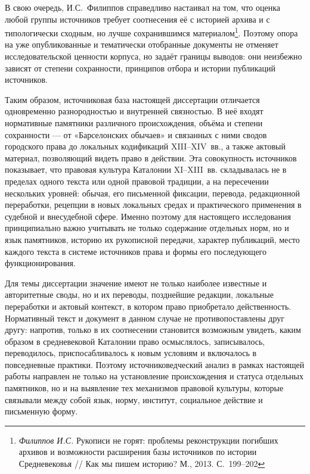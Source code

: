 В свою очередь, И.С.~Филиппов справедливо настаивал на том, что оценка любой группы источников требует соотнесения её с историей архива и с типологически сходным, но лучше сохранившимся материалом\footnote{\emph{Филиппов И.С.} Рукописи не горят: проблемы реконструкции погибших архивов и возможности расширения базы источников по истории Средневековья // Как мы пишем историю? М., 2013. С.~199--202}. Поэтому опора на уже опубликованные и тематически отобранные документы не отменяет исследовательской ценности корпуса, но задаёт границы выводов: они неизбежно зависят от степени сохранности, принципов отбора и истории публикаций источников.

Таким образом, источниковая база настоящей диссертации отличается одновременно разнородностью и внутренней связностью. В неё входят нормативные памятники различного происхождения, объёма и степени сохранности --- от «Барселонских обычаев» и связанных с ними сводов городского права до локальных кодификаций XIII--XIV~вв., а также актовый материал, позволяющий видеть право в действии. Эта совокупность источников показывает, что правовая культура Каталонии XI--XIII~вв. складывалась не в пределах одного текста или одной правовой традиции, а на пересечении нескольких уровней: обычая, его письменной фиксации, перевода, редакционной переработки, рецепции в новых локальных средах и практического применения в судебной и внесудебной сфере. Именно поэтому для настоящего исследования принципиально важно учитывать не только содержание отдельных норм, но и язык памятников, историю их рукописной передачи, характер публикаций, место каждого текста в системе источников права и формы его последующего функционирования.

Для темы диссертации значение имеют не только наиболее известные и авторитетные своды, но и их переводы, позднейшие редакции, локальные переработки и актовый контекст, в котором право приобретало действенность. Нормативный текст и документ в данном случае не противопоставлены друг другу: напротив, только в их соотнесении становится возможным увидеть, каким образом в средневековой Каталонии право осмыслялось, записывалось, переводилось, приспосабливалось к новым условиям и включалось в повседневные практики. Поэтому источниковедческий анализ в рамках настоящей работы направлен не только на установление происхождения и статуса отдельных памятников, но и на выявление тех механизмов правовой культуры, которые связывали между собой язык, норму, институт, социальное действие и письменную форму.

